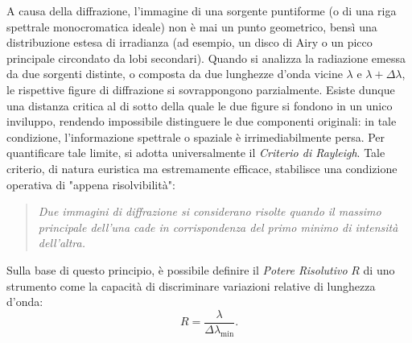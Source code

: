 \documentclass[a4paper,11pt]{report}
\begin{document}
\noindent
A causa della diffrazione, l'immagine di una sorgente puntiforme (o di una riga spettrale monocromatica ideale) non è mai un punto geometrico, bensì una distribuzione estesa di irradianza (ad esempio, un disco di Airy o un picco principale circondato da lobi secondari).
Quando si analizza la radiazione emessa da due sorgenti distinte, o composta da due lunghezze d'onda vicine $\lambda$ e $\lambda + \Delta\lambda$, le rispettive figure di diffrazione si sovrappongono parzialmente. Esiste dunque una distanza critica al di sotto della quale le due figure si fondono in un unico inviluppo, rendendo impossibile distinguere le due componenti originali: in tale condizione, l'informazione spettrale o spaziale è irrimediabilmente persa.
Per quantificare tale limite, si adotta universalmente il \textit{Criterio di Rayleigh}. Tale criterio, di natura euristica ma estremamente efficace, stabilisce una condizione operativa di "appena risolvibilità":
\begin{quote}
    \textit{Due immagini di diffrazione si considerano risolte quando il massimo principale dell'una cade in corrispondenza del primo minimo di intensità dell'altra.}
\end{quote}
Sulla base di questo principio, è possibile definire il \textit{Potere Risolutivo} $R$ di uno strumento come la capacità di discriminare variazioni relative di lunghezza d'onda:
\begin{equation}
    R = \frac{\lambda}{\Delta\lambda_{\min}}.
\end{equation}
\end{document}
